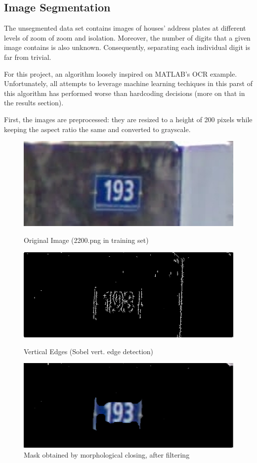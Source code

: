 \documentclass{article} %
\begin{document}
\subsection{Image Segmentation}
The unsegmented data set contains images of houses' address plates at different levels of zoom of zoom and isolation. Moreover, the number of digits that a given image contains is also unknown. Consequently, separating each individual digit is far from trivial.

For this project, an algorithm loosely inspired on MATLAB's OCR example\cite{automaticdetect}. Unfortunately, all attempts to leverage machine learning techiques in this parst of this algorithm has performed worse than hardcoding decisions (more on that in the results section).

First, the images are preprocessed: they are resized to a height of 200 pixels while keeping the aspect ratio the same and converted to grayscale.

\begin{figure}[!htb]
  \includegraphics[width=\linewidth]{images/image02}
  \caption{Original Image (2200.png in training set)}
  \label{fig:orig}
\endminipage\hfill
{}
  \includegraphics[width=\linewidth]{images/image06}
  \caption{Vertical Edges (Sobel vert. edge detection)}
  \label{fig:vertical}
\endminipage\hfill
{}%
  \includegraphics[width=\linewidth]{images/image00}
  \caption{Mask obtained by morphological closing, after filtering}
  \label{fig:mask}
\endminipage
\end{figure}
\end{document}
